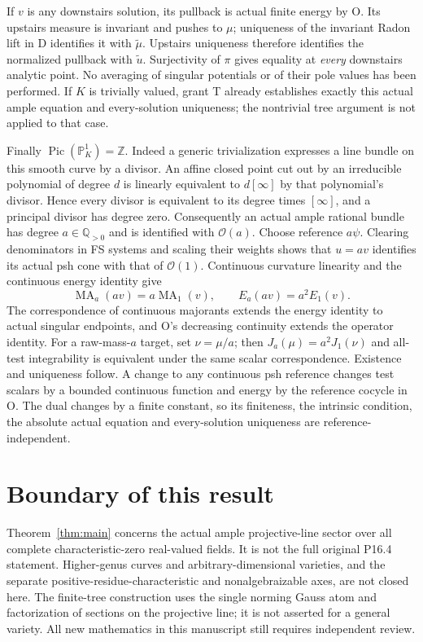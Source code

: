 \documentclass[11pt]{article}
\newcommand{\MA}{\operatorname{MA}}
\begin{document}
If $v$ is any downstairs solution, its pullback is actual
finite energy by O. Its upstairs measure is invariant and
pushes to $\mu$; uniqueness of the invariant Radon lift in D
identifies it with $\widetilde\mu$. Upstairs uniqueness
therefore identifies the normalized pullback with
$\widetilde u$. Surjectivity of $\pi$ gives equality at
\emph{every} downstairs analytic point.
No averaging of singular potentials or of their pole values
has been performed. If $K$ is trivially valued, grant T
already establishes exactly this actual ample equation and
every-solution uniqueness; the nontrivial tree argument is
not applied to that case.

Finally $\operatorname{Pic}(\mathbb P^1_K)=\mathbb Z$. Indeed a
generic trivialization expresses a line bundle on this smooth curve
by a divisor. An affine closed point cut out by an irreducible
polynomial of degree $d$ is linearly equivalent to $d[\infty]$
by that polynomial's divisor. Hence every divisor is equivalent to
its degree times $[\infty]$, and a principal divisor has degree
zero. Consequently an
actual ample rational bundle has degree $a\in\mathbb Q_{>0}$
and is identified with $\mathcal O(a)$. Choose reference
$a\psi$. Clearing denominators in FS systems and scaling
their weights shows that $u=av$ identifies its actual psh
cone with that of $\mathcal O(1)$. Continuous curvature
linearity and the continuous energy identity give
\[
 \MA_a(av)=a\MA_1(v),\qquad E_a(av)=a^2E_1(v).
\]
The correspondence of continuous majorants extends the
energy identity to actual singular endpoints, and O's
decreasing continuity extends the operator identity.
For a raw-mass-$a$ target, set $\nu=\mu/a$; then
$J_a(\mu)=a^2J_1(\nu)$ and all-test integrability is
equivalent under the same scalar correspondence. Existence
and uniqueness follow. A change to any continuous psh
reference changes test scalars by a bounded continuous
function and energy by the reference cocycle in O.
The dual changes by a finite constant, so its finiteness,
the intrinsic condition, the absolute actual equation and
every-solution uniqueness are reference-independent.

\section{Boundary of this result}

Theorem~\ref{thm:main} concerns the actual ample projective-line
sector over all complete characteristic-zero real-valued
fields. It is not the full original P16.4 statement.
Higher-genus curves and arbitrary-dimensional varieties,
and the separate positive-residue-characteristic and
nonalgebraizable axes, are not closed here. The finite-tree
construction uses the single norming Gauss atom and
factorization of sections on the projective line; it is
not asserted for a general variety. All new mathematics in
this manuscript still requires independent review.
\end{document}

